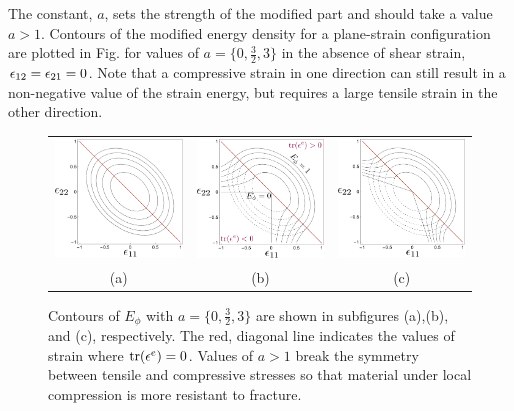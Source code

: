 The constant, $a$, sets the strength of the modified part and should take a value $a>1$. Contours of the modified energy density for a plane-strain configuration are plotted in Fig. for values of $a=\{0,\tfrac{3}{2},3\}$ in the absence of shear strain, $\epsilon_{12}=\epsilon_{21}=0$. Note that a compressive strain in one direction can still result in a non-negative value of the strain energy, but requires a large tensile strain in the other direction.


\begin{figure}[h!]
	\begin{center}
	\begin{tabular}{ccc}
		\includegraphics[width=0.3\columnwidth]{ch-fracture/asymmetric_energy/plot_0} &
		\includegraphics[width=0.3\columnwidth]{ch-fracture/asymmetric_energy/plot_15} &
		\includegraphics[width=0.3\columnwidth]{ch-fracture/asymmetric_energy/plot_3}  \\
		(a) & (b) & (c)
	\end{tabular}
	\caption{Contours of $E_{\phi}$ with $a=\{0,\tfrac{3}{2},3\}$ are shown in subfigures (a),(b), and (c), respectively. The red, diagonal line indicates the values of strain where $\text{tr}(\epsilon^e)=0$. Values of $a>1$ break the symmetry between tensile and compressive stresses so that material under local compression is more resistant to fracture.}
	\label{fig:dihedral_angles}
	\end{center}
\end{figure}


